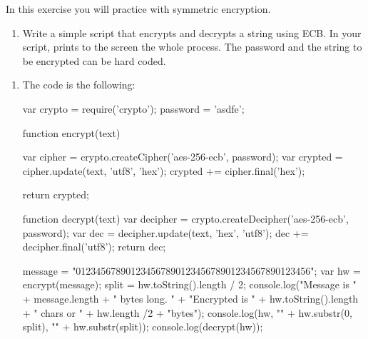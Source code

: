 
\begin{Exercise}[label={basic-js-crypto-aes}]
In this exercise you will practice with symmetric encryption.

\begin{enumerate}[1.]
\item Write a simple script that encrypts and decrypts a string using ECB.
In your script, prints to the screen the whole process. 
The password and the string to be encrypted can be hard coded.
\end{enumerate}

\end{Exercise}

\begin{Answer}[ref={basic-js-crypto-aes}]
\begin{enumerate}[1.]
\item The code is the following: 

\begin{js}
var crypto = require('crypto');
password = 'asdfe';


function encrypt(text) {
    var cipher = crypto.createCipher('aes-256-ecb', password);
    var crypted = cipher.update(text, 'utf8', 'hex');
    crypted += cipher.final('hex');

    return crypted;
}

function decrypt(text) {
    var decipher = crypto.createDecipher('aes-256-ecb', password);
    var dec = decipher.update(text, 'hex', 'utf8');
    dec += decipher.final('utf8');
    return dec;
}

message = "01234567890123456789012345678901234567890123456";
var hw = encrypt(message);
split = hw.toString().length / 2;
console.log("Message is " + message.length + " bytes long. " +
    "Encrypted is " + hw.toString().length + " chars or " + hw.length /2 + "bytes");
console.log(hw, "\n" + hw.substr(0, split), "\n" + hw.substr(split));
console.log(decrypt(hw));
\end{js}

\end{enumerate}
\end{Answer}
